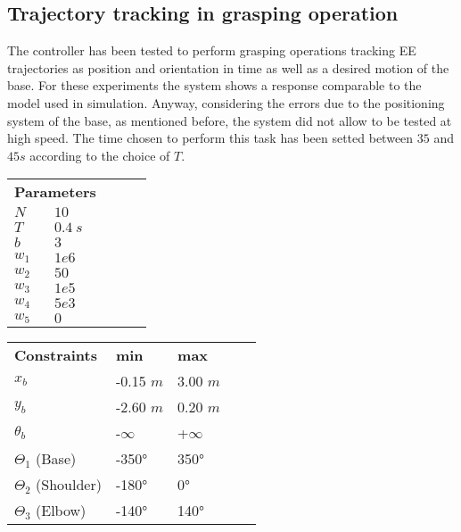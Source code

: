 \subsection{Trajectory tracking in grasping operation}

The controller has been tested to perform grasping operations tracking EE trajectories as position and orientation in time as well as a desired motion of the base. For these experiments the system shows a response comparable to the model used in simulation. Anyway, considering the errors due to the positioning system of the base, as mentioned before, the system did not allow to be tested at high speed. The time chosen to perform this task has been setted between $35$ and $45 s$ according to the choice of $T$. 

	\begin{table}[h]
	\centering
	\begin{tabular}{|l|l|l|ll}
	\cline{1-2}
	\multicolumn{2}{|l|}{ \textbf{Parameters} }	\\ \cline{1-2}
	$N$     				&  $10$ 	      					\\ \cline{1-2}
	$T$     				&  $0.4\ s$  	      					\\ \cline{1-2}
	$b$     				&  $3$ 	      						\\ \cline{1-2}
	$w_1$    				&  $1e6$       						\\ \cline{1-2}
	$w_2$    				&  $50$       						\\ \cline{1-2}
	$w_3$    				&  $1e5$       						\\ \cline{1-2}
	$w_4$    				&  $5e3$       						\\ \cline{1-2}
	$w_5$    				&  $0$      						\\ \cline{1-2}
	\end{tabular}
	\quad
	\begin{tabular}{|l|l|l|ll}
	\cline{1-3}
	\textbf{Constraints}    	& \textbf{min} 					& \textbf{max}			\\ \cline{1-3}
	$x_b$		 			 		&  -0.15 $m$ 					&  3.00 $m$ 			\\ \cline{1-3}
	$y_b$		 			 		&  -2.60 $m$ 					&  0.20 $m$ 			\\ \cline{1-3}
	$\theta_b$ 			 		&  -$\infty$  					&  +$\infty$ 			\\ \cline{1-3}
	$\Theta_1$ (Base)			&  -350°  						&  350° 				\\ \cline{1-3}
	$\Theta_2$ (Shoulder)		&  -180° 						&  0°		 			\\ \cline{1-3}
	$\Theta_3$ (Elbow) 			&  -140° 						&  140°		 			\\ \cline{1-3}

\end{tabular}
\end{table}
